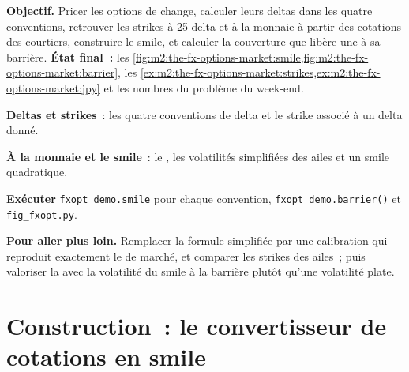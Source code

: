 \begin{tutorial}
\textbf{Objectif.} Pricer les options de change, calculer leurs deltas dans les quatre conventions,
retrouver les strikes à 25 delta et à la monnaie à partir des cotations des courtiers, construire le smile,
et calculer la couverture que libère une  à sa barrière. \textbf{État final~:}
les \cref{fig:m2:the-fx-options-market:smile,fig:m2:the-fx-options-market:barrier},
les \cref{ex:m2:the-fx-options-market:strikes,ex:m2:the-fx-options-market:jpy} et les
nombres du problème du week-end.
\begin{tutsteps}
\item \textbf{Deltas et strikes}~: les quatre conventions de delta et le strike
associé à un delta donné.
\label{lst:m2:the-fx-options-market:delta}
\item \textbf{À la monnaie et le smile}~: le , les
volatilités simplifiées des ailes et un smile quadratique.
\label{lst:m2:the-fx-options-market:smile}
\item \textbf{Exécuter} \texttt{fxopt\_demo.smile} pour chaque convention,
\texttt{fxopt\_demo.barrier()} et \texttt{fig\_fxopt.py}.
\end{tutsteps}
\textbf{Pour aller plus loin.} Remplacer la formule simplifiée par une calibration qui
reproduit exactement le  de marché, et comparer les strikes des ailes~; puis valoriser la
 avec la volatilité du smile à la barrière plutôt qu'une volatilité plate.
\end{tutorial}

\section{Construction~: le convertisseur de cotations en smile}\label{bld:m2:the-fx-options-market:fxsmile}

